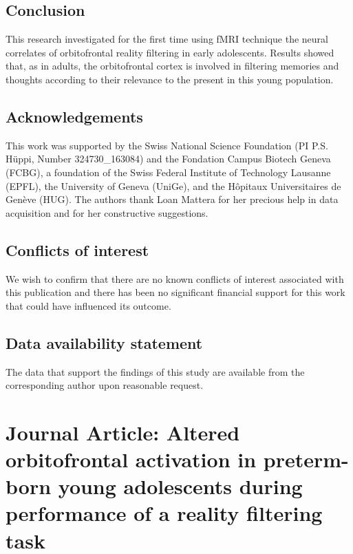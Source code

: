 \subsection*{Conclusion}

This research investigated for the first time using fMRI technique the neural correlates of orbitofrontal reality filtering in early adolescents. Results showed that, as in adults, the orbitofrontal cortex is involved in filtering memories and thoughts according to their relevance to the present in this young population. 







\subsection*{Acknowledgements}

This work was supported by the Swiss National Science Foundation (PI P.S. Hüppi, Number 324730\_163084) and the Fondation Campus Biotech Geneva (FCBG), a foundation of the Swiss Federal Institute of Technology Lausanne (EPFL), the University of Geneva (UniGe), and the Hôpitaux Universitaires de Genève (HUG). The authors thank Loan Mattera for her precious help in data acquisition and for her constructive suggestions.

\subsection*{Conflicts of interest}

We wish to confirm that there are no known conflicts of interest associated with this publication and there has been no significant financial support for this work that could have influenced its outcome. 

\subsection*{Data availability statement}

The data that support the findings of this study are available from the corresponding author upon reasonable request.



\newpage
\section{Journal Article: Altered orbitofrontal activation in preterm-born young adolescents during performance of a reality filtering task} \label{section:ch4_orfi_groups}

